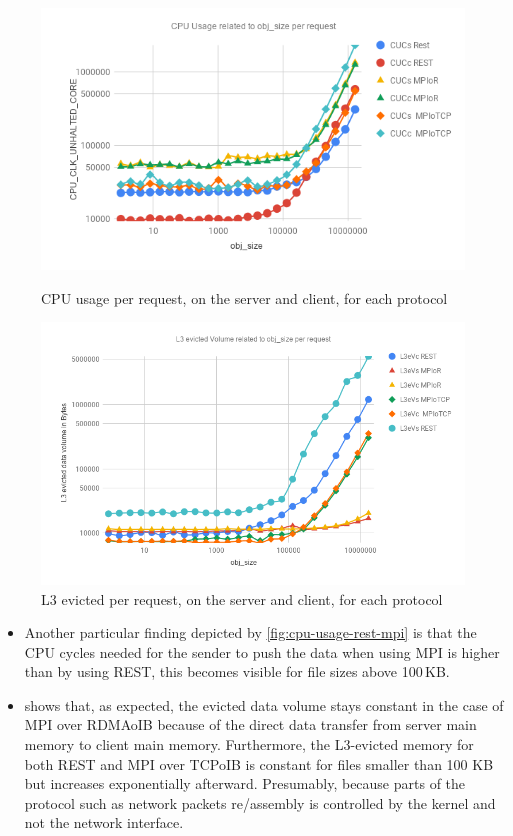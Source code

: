 \documentclass[runningheads]{llncs}
\begin{document}
\begin{figure}
    \centering
    \begin{minipage}{0.49\textwidth}
        \centering
        \includegraphics[width=1\textwidth]{cpu-usage-rest-mpi.png}
        \caption{CPU usage per request, on the server and client, for each protocol}
		\label{fig:cpu-usage-rest-mpi}
    \end{minipage}\hfill
    \begin{minipage}{0.49\textwidth}
        \centering
        \includegraphics[width=1\textwidth]{l3ev-rest-mpi.png}
        \caption{L3 evicted per request, on the server and client, for each protocol}
		\label{fig:l3ev-rest-mpi}
    \end{minipage}
\end{figure}
\begin{itemize}
\item Another particular finding depicted by \cref{fig:cpu-usage-rest-mpi} is that the CPU cycles needed for the sender to push the data when using MPI is higher than by using REST, this becomes visible for file sizes above 100\,KB.
\item {} shows that, as expected, the evicted data volume stays constant in the case of MPI over RDMAoIB because of the direct data transfer from server main memory to client main memory. Furthermore, the L3-evicted memory for both REST and MPI over TCPoIB is constant for files smaller than 100 KB but increases exponentially afterward. Presumably, because parts of the protocol such as network packets re/assembly is controlled by the kernel and not the network interface.
\end{itemize}
\end{document}
